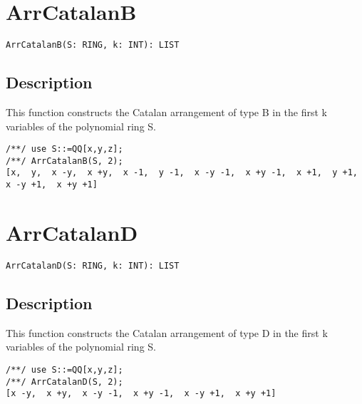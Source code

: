 \documentclass[a4paper]{mybook}
\newenvironment{command}{}{} %
\begin{document}
\section{ArrCatalanB}
\label{ArrCatalanB}
\begin{command} %


\begin{Verbatim}[label=syntax, rulecolor=\color{MidnightBlue},
frame=single]
ArrCatalanB(S: RING, k: INT): LIST 
\end{Verbatim}


\subsection*{Description}

This function constructs the Catalan arrangement of type B in the first k variables of the polynomial ring S.
\begin{Verbatim}[label=example, rulecolor=\color{PineGreen}, frame=single]
/**/ use S::=QQ[x,y,z];	
/**/ ArrCatalanB(S, 2);
[x,  y,  x -y,  x +y,  x -1,  y -1,  x -y -1,  x +y -1,  x +1,  y +1,  x -y +1,  x +y +1]
\end{Verbatim}


\end{command} %

\section{ArrCatalanD}
\label{ArrCatalanD}
\begin{command} %


\begin{Verbatim}[label=syntax, rulecolor=\color{MidnightBlue},
frame=single]
ArrCatalanD(S: RING, k: INT): LIST 
\end{Verbatim}


\subsection*{Description}

This function constructs the Catalan arrangement of type D in the first k variables of the polynomial ring S.
\begin{Verbatim}[label=example, rulecolor=\color{PineGreen}, frame=single]
/**/ use S::=QQ[x,y,z];	
/**/ ArrCatalanD(S, 2);
[x -y,  x +y,  x -y -1,  x +y -1,  x -y +1,  x +y +1]
\end{Verbatim}


\end{command} %
\end{document}
